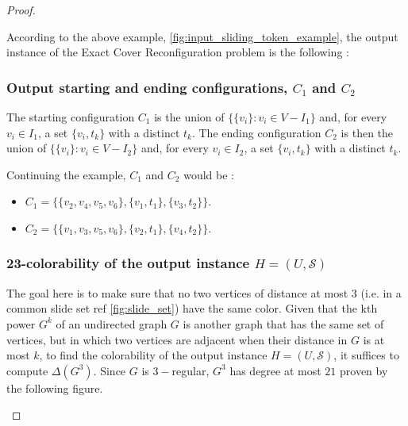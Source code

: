 \begin{proof}
\begin{example}According to the above example, \ref{fig:input_sliding_token_example}, the output instance of the Exact Cover Reconfiguration problem is the following :
\end{example}

\subsubsection{Output starting and ending configurations, $C_1$ and $C_2$}
The starting configuration $C_1$ is the union of $\{\{ v_i \} : v_i \in V - I_1\}$ and, for every $v_i \in I_1$, a set $\{v_i, t_k\}$ with a distinct $t_k$.
The ending configuration $C_2$ is then the union of $\{\{ v_i \} : v_i \in V - I_2\}$ and, for every $v_i \in I_2$, a set $\{v_i, t_k\}$ with a distinct $t_k$.

\begin{example}Continuing the example, $C_1$ and $C_2$ would be :
\begin{itemize}
  \item $C_1 = \{ \{v_2, v_4, v_5, v_6\}, \{v_1, t_1\}, \{v_3, t_2\}\}$.
  \item $C_2 = \{ \{v_1, v_3, v_5, v_6\}, \{v_2, t_1\}, \{v_4, t_2\}\}$.
\end{itemize}
\end{example}

\subsubsection{23-colorability of the output instance $H = (U, \mathcal{S})$}
The goal here is to make sure that no two vertices of distance at most $3$ (i.e. in a common slide set ref \ref{fig:slide_set}) have the same color. Given that
the kth power $G^{k}$ of an undirected graph $G$ is another graph that has the same set of vertices, but in which two vertices are adjacent when their
distance in $G$ is at most $k$, to find the colorability of the output instance $H = (U, \mathcal{S})$, it suffices to compute $\Delta(G^{3})$. Since $G$ is
$3-$regular, $G^3$ has degree at most $21$ proven by the following figure.

\begin{figure} [H]
  \centering
\end{figure}
\end{proof}
